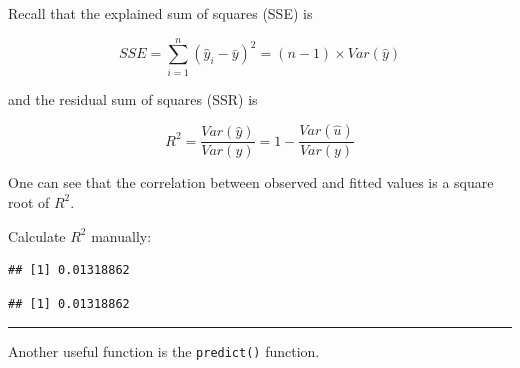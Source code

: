 \documentclass[]{book}
\newenvironment{Shaded}{\begin{snugshade}}{\end{snugshade}}
\newcommand{\CommentTok}[1]{\textcolor[rgb]{0.56,0.35,0.01}{\textit{#1}}}
\newcommand{\DecValTok}[1]{\textcolor[rgb]{0.00,0.00,0.81}{#1}}
\newcommand{\KeywordTok}[1]{\textcolor[rgb]{0.13,0.29,0.53}{\textbf{#1}}}
\newcommand{\NormalTok}[1]{#1}
\newcommand{\OperatorTok}[1]{\textcolor[rgb]{0.81,0.36,0.00}{\textbf{#1}}}
\newcommand{\StringTok}[1]{\textcolor[rgb]{0.31,0.60,0.02}{#1}}
\begin{document}
Recall that the explained sum of squares (SSE) is

\begin{equation}
SSE = \sum_{i=1}^{n}(\hat{y}_{i} - \bar{y})^2 = (n-1) \times Var(\hat{y})
\label{eq:SSE}
\end{equation}

and the residual sum of squares (SSR) is

\begin{equation}
R^2 = \frac{Var(\hat{y})}{Var(y)} = 1 - \frac{Var(\hat{u})}{Var(y)} 
\label{eq:SSR}
\end{equation}

One can see that the correlation between observed and fitted values is a
square root of \(R^2\).

Calculate \(R^2\) manually:

\begin{Shaded}
\end{Shaded}

\begin{verbatim}
## [1] 0.01318862
\end{verbatim}

\begin{Shaded}
\end{Shaded}

\begin{verbatim}
## [1] 0.01318862
\end{verbatim}

\begin{center}\rule{0.5\linewidth}{\linethickness}\end{center}

Another useful function is the \texttt{predict()} function.

\begin{Shaded}
\end{Shaded}
\end{document}
